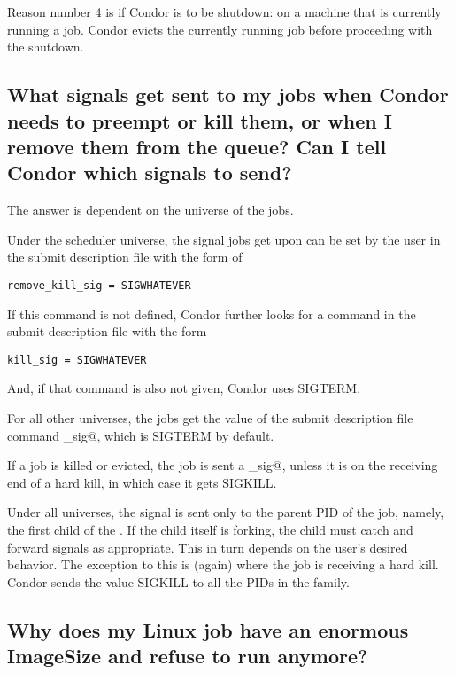 Reason number 4 is if Condor is to be shutdown:
on a machine that is currently running a job.
Condor evicts the currently running job before proceeding
with the shutdown.

\subsection*{What signals get sent to my jobs when Condor needs to preempt or kill them, or when I remove them from the queue?  Can I tell Condor which signals to send?}

The answer is dependent on the universe of the jobs.

Under the scheduler universe,
the signal jobs get upon  can be set by
the user in the submit description file with the form of
\begin{verbatim}
remove_kill_sig = SIGWHATEVER
\end{verbatim}
If this command is not defined, 
Condor further looks for a command 
in the submit description file with the form
\begin{verbatim}
kill_sig = SIGWHATEVER
\end{verbatim}
And, if that command is also not given,
Condor uses SIGTERM.

For all other universes, the jobs get the value of
the submit description file command
\verb@kill_sig@, which is SIGTERM by default.

If a job is killed or evicted, the job is sent a
\verb@kill_sig@, 
unless it is on the receiving end of a hard kill,
in which case it gets SIGKILL.

Under all universes,
the signal is sent only to the parent PID of the job,
namely, the first child of the .
If the child itself is forking,
the child must catch and forward signals as appropriate.
This in turn depends on the user's desired behavior.
The exception to this is (again) where the job is receiving
a hard kill.
Condor sends the value SIGKILL to all the PIDs in the family.

\subsection*{Why does my Linux job have an enormous ImageSize and
refuse to run anymore?}

